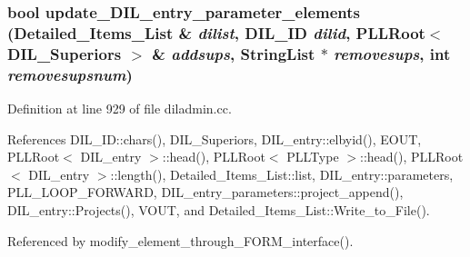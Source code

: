 \subsubsection{\setlength{\rightskip}{0pt plus 5cm}bool update\_\-DIL\_\-entry\_\-parameter\_\-elements ({\bf Detailed\_\-Items\_\-List} \& {\em dilist}, {\bf DIL\_\-ID} {\em dilid}, {\bf PLLRoot}$<$ DIL\_\-Superiors $>$ \& {\em addsups}, {\bf String\-List} $\ast$ {\em removesups}, int {\em removesupsnum})}\label{dil2al_8hh_a305}




Definition at line 929 of file diladmin.cc.

References DIL\_\-ID::chars(), DIL\_\-Superiors, DIL\_\-entry::elbyid(), EOUT, PLLRoot$<$ DIL\_\-entry $>$::head(), PLLRoot$<$ PLLType $>$::head(), PLLRoot$<$ DIL\_\-entry $>$::length(), Detailed\_\-Items\_\-List::list, DIL\_\-entry::parameters, PLL\_\-LOOP\_\-FORWARD, DIL\_\-entry\_\-parameters::project\_\-append(), DIL\_\-entry::Projects(), VOUT, and Detailed\_\-Items\_\-List::Write\_\-to\_\-File().

Referenced by modify\_\-element\_\-through\_\-FORM\_\-interface().



